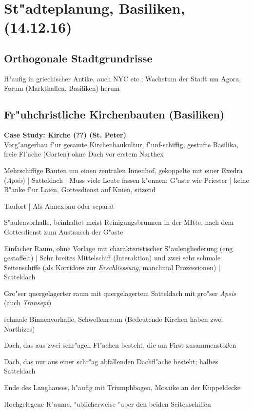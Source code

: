 \documentclass[emulatestandardclasses]{scrartcl}
\begin{document}
\section{St"adteplanung, Basiliken, \\(14.12.16)}

\subsection{Orthogonale Stadtgrundrisse}

H"aufig in griechischer Antike, auch NYC etc.; Wachstum der Stadt um Agora, Forum (Markthallen, Basiliken) herum


\subsection{Fr"uhchristliche Kirchenbauten (Basiliken)}

\noindent\textbf{Case Study: Kirche (??) (St. Peter)}\\
Vorg"angerbau f"ur gesamte Kirchenbaukultur, f"unf-schiffig, gestufte Basilika, freie Fl"ache (Garten) ohne Dach vor erstem Narthex


\begin{description}[leftmargin=!,labelwidth=\widthof{\bfseries Baptisterium}]
  \item[Basilika] Mehrschiffige Bauten um einen zentralen Innenhof, gekoppelte mit einer Exedra (\emph{Apsis}) | Satteldach | Muss viele Leute fassen k"onnen: G"aste wie Priester | keine B"anke f"ur Laien, Gottesdienst auf Knien, sitzend 
  \item[Baptisterium] Taufort | Als Annexbau oder separat
  \item[Atrium] S"aulenvorhalle, beinhaltet meist Reinigungsbrunnen in der MItte, nach dem Gottesdienst zum Austausch der G"aste
  \item[Langhaus] Einfacher Raum, ohne Vorlage mit charakteristischer S"aulengliederung (eng gestaffelt) | Sehr breites Mittelschiff (Interaktion) und zwei sehr schmale Seitenschiffe (als Korridore zur \emph{Erschliessung}, manchmal Prozessionen) | Satteldach
  \item[Querhaus] Gro"ser quergelagerter raum mit quergelagertem Satteldach mit gro"ser \emph{Apsis} (auch \emph{Transept})
  \item[Narthex] schmale Binnenvorhalle, Schwellenraum (Bedeutende Kirchen haben zwei Narthizes)
  \item[Satteldach] Dach, das aus zwei schr"agen Fl"achen besteht, die am First zusammenstoßen
  \item[Pultdach] Dach, das nur aus einer schr"ag abfallenden Dachfl"ache besteht; halbes Satteldach
  \item[Apsis] Ende des Langhauses, h"aufig mit Triumphbogen, Mosaike an der Kuppeldecke
  \item[Zigorium]  
  \item[Empore] Hochgelegene R"aume, "ublicherweise "uber den beiden Seitenschiffen
\end{description}
\end{document}
